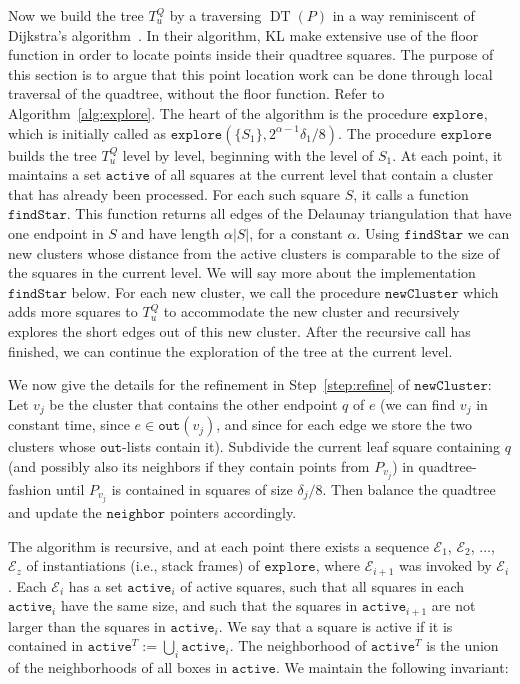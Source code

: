 \documentclass[11pt]{paper}
\newcommand {\eqdef} {:=}
\DeclareMathOperator {\DT}{DT}
\begin{document}
Now we build the tree $T_u^Q$ by a traversing $\DT(P)$ in
a way reminiscent of Dijkstra's algorithm~\cite{CormenLeRiSt09}.
In their algorithm, KL make extensive use of the floor function 
in order to locate points inside their quadtree squares. The 
purpose of this section is to argue that this point location work 
can be done through local traversal of the quadtree, without 
the floor function.
Refer to Algorithm~\ref{alg:explore}.
The heart of the algorithm is the procedure $\texttt{explore}$, 
which is initially called as
$\texttt{explore}(\{S_1\},2^{\alpha-1}\delta_1/8)$.
The procedure $\texttt{explore}$ builds the tree $T_u^Q$ level
by level, beginning with the level of $S_1$.
At each point, it maintains
a set $\texttt{active}$ of all squares at the current level that contain 
a cluster that has already been processed. For each such square $S$,
it calls a function $\texttt{findStar}$. This function
returns all edges of the Delaunay triangulation that have one endpoint in
$S$ and have length $\alpha|S|$, for a constant $\alpha$. Using 
$\texttt{findStar}$
we can  new clusters whose distance from the active clusters
is comparable to the size of the squares in the current level.
We will say more about the implementation $\texttt{findStar}$ below.
For each new cluster, we call the procedure $\texttt{newCluster}$ 
which adds more squares to $T_u^Q$ to accommodate the new cluster and 
recursively explores the short edges out of this new cluster. After
the recursive call has finished, we can continue the exploration of the
tree at the current level. 

We now give the details
for the refinement in Step~\ref{step:refine} of $\texttt{newCluster}$:
Let $v_j$ be
the cluster that contains the other endpoint $q$ of $e$ (we can find $v_j$
in constant time, since $e \in \texttt{out}(v_j)$, and
since for each edge we store the two clusters whose $\texttt{out}$-lists
contain it). Subdivide the current leaf square containing $q$ (and 
possibly also its neighbors if they contain points from $P_{v_j}$) 
in quadtree-fashion until $P_{v_j}$ is contained in squares of 
size $\delta_j/8$.  Then balance the quadtree and update the 
$\texttt{neighbor}$ pointers
accordingly. 

The algorithm is recursive, and at each point there exists
a sequence $\mathcal{E}_1$, $\mathcal{E}_2$, $\ldots$, $\mathcal{E}_z$
of instantiations (i.e., stack frames) 
of $\texttt{explore}$, where $\mathcal{E}_{i+1}$
was invoked by $\mathcal{E}_{i}$. Each $\mathcal{E}_i$ has a set
$\texttt{active}_i$ of active
squares, such that all squares in each $\texttt{active}_i$
have the same size, and such that the squares in $\texttt{active}_{i+1}$
are not larger than the squares in $\texttt{active}_i$.
We say that a square is active if it is contained in
$\texttt{active}^T \eqdef \bigcup_i \texttt{active}_i$.
The neighborhood of $\texttt{active}^T$
is the union of the neighborhoods of all boxes in $\texttt{active}$.
We maintain the following invariant:
\end{document}
